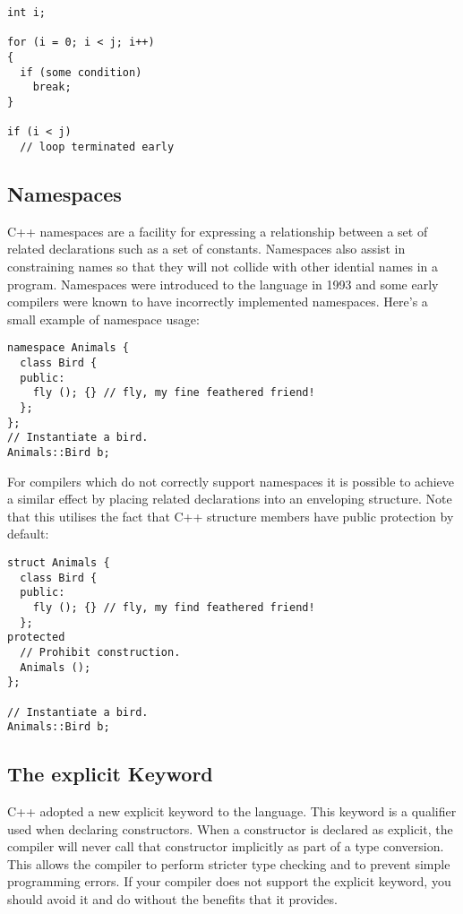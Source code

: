 \begin{Verbatim}[frame=single]
int i;

for (i = 0; i < j; i++)
{
  if (some condition)
    break;
}

if (i < j)
  // loop terminated early
\end{Verbatim}

\subsection{Namespaces}

C++ namespaces are a facility for expressing a relationship between a set of related declarations such as a set of constants. Namespaces also assist in constraining names so that they will not collide with other idential names in a program. Namespaces were introduced to the language in 1993 and some early compilers were known to have incorrectly implemented namespaces. Here's a small example of namespace usage:

 	
\begin{verbatim}
namespace Animals {
  class Bird {
  public:
    fly (); {} // fly, my fine feathered friend!
  };
};
// Instantiate a bird.
Animals::Bird b;
\end{verbatim}


For compilers which do not correctly support namespaces it is possible to achieve a similar effect by placing related declarations into an enveloping structure. Note that this utilises the fact that C++ structure members have public protection by default: 

\begin{Verbatim}[frame=single]
struct Animals {
  class Bird {
  public:
    fly (); {} // fly, my find feathered friend!
  };
protected
  // Prohibit construction.
  Animals ();
};

// Instantiate a bird.
Animals::Bird b;
\end{Verbatim}

\subsection{The explicit Keyword}

C++ adopted a new explicit keyword to the language. This keyword is a qualifier used when declaring constructors. When a constructor is declared as explicit, the compiler will never call that constructor implicitly as part of a type conversion. This allows the compiler to perform stricter type checking and to prevent simple programming errors. If your compiler does not support the explicit keyword, you should avoid it and do without the benefits that it provides. 


